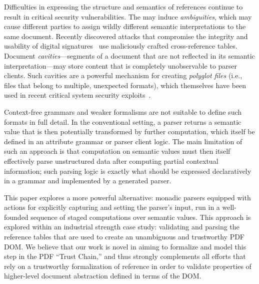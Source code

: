 Difficulties in expressing the structure and semantics of references
continue to result in critical security vulnerabilities.
%
The may induce \emph{ambiguities}, which may cause different parties
to assign wildly different semantic interpretations to the same
document.
%
Recently discovered attacks that compromise the integrity and
usability of digital
signatures~\cite{rohlmannBreakingSpecificationPDF2021,
mainkaShadowAttacksHiding2021} use maliciously crafted
cross-reference tables.
%
Document \emph{cavities}---segments of a document that are not
reflected in its semantic interpretation---may store content that is
completely unobservable to parser clients.
%
Such cavities are a powerful mechanism for creating \emph{polyglot
files} (i.e., files that belong to multiple, unexpected formats),
which themselves have been used in recent critical system security
exploits~\cite{psychicPaper}.

Context-free grammars and weaker formalisms are not suitable to define 
such formats in full detail.
%
In the conventional setting, a parser returns a semantic value that is
then potentially transformed by further computation, which itself be
defined in an attribute grammar or parser client logic.
%
The main limitation of such an approach is that computation on
semantic values must then itself effectively parse unstructured data
after computing partial contextual information;
%
such parsing logic is exactly what should be expressed declaratively
in a grammar and implemented by a generated parser.

This paper explores a more powerful alternative: monadic parsers equipped 
with actions for explicitly capturing and setting the parser's input, run 
in a well-founded sequence of staged computations over semantic values.
%
This approach is explored within an industrial strength case study:
validating and parsing the reference tables that are used to create 
an unambiguous and trustworthy PDF DOM.
%
We believe that our work is novel in aiming to formalize and model
this step in the PDF ``Trust Chain,'' and thus strongly complements all
efforts that rely on a trustworthy formalization of reference in order
to validate properties of higher-level document abstraction defined in
terms of the DOM.


